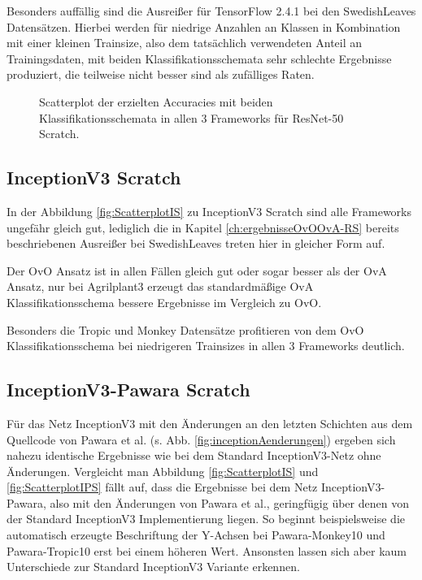 Besonders auffällig sind die Ausreißer für TensorFlow 2.4.1 \cite{tensorflow} bei den SwedishLeaves \cite{swedishLeaves} Datensätzen. Hierbei werden für niedrige Anzahlen an Klassen in Kombination mit einer kleinen Trainsize, also dem tatsächlich verwendeten Anteil an Trainingsdaten, mit beiden Klassifikationsschemata sehr schlechte Ergebnisse produziert, die teilweise nicht besser sind als zufälliges Raten.
\begin{figure}[H]
\hspace*{-1.5cm}

\caption{Scatterplot der erzielten Accuracies mit beiden Klassifikationsschemata in allen 3 Frameworks für ResNet-50 Scratch.}
\label{fig:ScatterplotRS}
\end{figure}

\newpage

\subsection{InceptionV3 Scratch}
In der Abbildung \ref{fig:ScatterplotIS} zu InceptionV3 Scratch sind alle Frameworks ungefähr gleich gut, lediglich die in Kapitel \ref{ch:ergebnisseOvOOvA-RS} bereits beschriebenen Ausreißer bei SwedishLeaves \cite{swedishLeaves} treten hier in gleicher Form auf.

Der OvO Ansatz ist in allen Fällen gleich gut oder sogar besser als der OvA Ansatz, nur bei Agrilplant3 erzeugt das standardmäßige OvA Klassifikationsschema bessere Ergebnisse im Vergleich zu OvO.

Besonders die Tropic und Monkey \cite{pawaraWebsiteDatensaetze} Datensätze profitieren von dem OvO Klassifikationsschema bei niedrigeren Trainsizes in allen 3 Frameworks deutlich.


\subsection{InceptionV3-Pawara Scratch}
\label{ch:ergebnisseOvOOvA-IPS}
Für das Netz InceptionV3 mit den Änderungen an den letzten Schichten aus dem Quellcode von Pawara et al. \cite{pawaraWebsiteCode} (s. Abb. \ref{fig:inceptionAenderungen}) ergeben sich nahezu identische Ergebnisse wie bei dem Standard InceptionV3-Netz ohne Änderungen. Vergleicht man Abbildung \ref{fig:ScatterplotIS} und \ref{fig:ScatterplotIPS} fällt auf, dass die Ergebnisse bei dem Netz InceptionV3-Pawara, also mit den Änderungen von Pawara et al., geringfügig über denen von der Standard InceptionV3 Implementierung liegen. So beginnt beispielsweise die automatisch erzeugte Beschriftung der Y-Achsen bei Pawara-Monkey10 und Pawara-Tropic10 erst bei einem höheren Wert. Ansonsten lassen sich aber kaum Unterschiede zur Standard InceptionV3 Variante erkennen.


